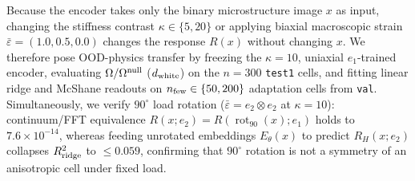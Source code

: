 \documentclass[preprint,11pt,a4paper]{elsarticle}
\begin{document}
Because the encoder takes only the binary microstructure image $x$ as input, changing the stiffness contrast $\kappa\in\{5,20\}$ or applying biaxial macroscopic strain $\bar\varepsilon=(1.0,0.5,0.0)$ changes the response $R(x)$ without changing $x$. We therefore pose OOD-physics transfer by freezing the $\kappa=10$, uniaxial $e_1$-trained encoder, evaluating $\Omega/\Omega^{\rm null}$ ($d_{\rm white}$) on the $n=300$ \texttt{test1} cells, and fitting linear ridge and McShane readouts on $n_{\rm few}\in\{50,200\}$ adaptation cells from \texttt{val}. Simultaneously, we verify $90^\circ$ load rotation ($\bar\varepsilon=e_2\otimes e_2$ at $\kappa=10$): continuum/FFT equivalence $R(x;e_2)=R(\operatorname{rot}_{90}(x);e_1)$ holds to $7.6\times 10^{-14}$, whereas feeding unrotated embeddings $E_\theta(x)$ to predict $R_H(x;e_2)$ collapses $R^2_{\rm ridge}$ to $\le 0.059$, confirming that $90^\circ$ rotation is not a symmetry of an anisotropic cell under fixed load.
\end{document}
